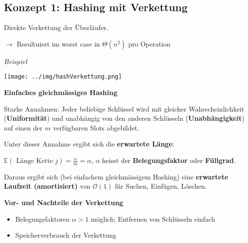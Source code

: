 \documentclass[german]{latex4ei/latex4ei_sheet}
\begin{document}
\begin{sectionbox}
\subsection{Konzept 1: Hashing mit Verkettung}\par\smallskip
Direkte Verkettung der Überläufer.\par
$\rightarrow$ Resultuiert im worst case in $\Theta(n^{2})$ pro Operation\par\smallskip

\textit{Beispiel}\par
\begin{center}
    \texttt{[image: ../img/hashVerkettung.png]}
\end{center}\smallskip

\textbf{Einfaches gleichmässiges Hashing}\par
Starke Annahmen: Jeder beliebige Schlüssel wird mit gleicher Wahrscheinlichkeit (\textbf{Uniformität}) und unabhängig von den anderen Schlüsseln (\textbf{Unabhängigkeit}) auf einen der $m$ verfügbaren Slots abgebildet.\par\smallskip
Unter dieser Annahme ergibt sich die \textbf{erwartete Länge}:\par $\mathbb{E}(\text { Länge Kette } j)=\frac{n}{m}=\alpha$, $\alpha$ heisst der \textbf{Belegungsfaktor} oder \textbf{Füllgrad}.\par\smallskip
Daraus ergibt sich (bei einfachem gleichmässigem Hashing) eine \textbf{erwartete Laufzeit (amortisiert)} von $\mathcal{O}(1)$ für Suchen, Einfügen, Löschen.\par\smallskip
\textbf{Vor- und Nachteile der Verkettung}\par
\begin{itemize}
    \item Belegungsfaktoren $\alpha > 1$ möglich; Entfernen von Schlüsseln einfach
    \item Speicherverbrauch der Verkettung
\end{itemize}\smallskip

\end{sectionbox}
\end{document}

